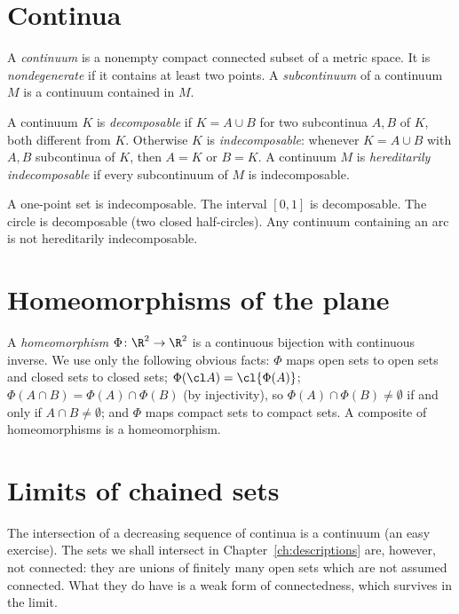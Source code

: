 \section{Continua}

\begin{definition}\label{def:continuum}
A \emph{continuum} is a nonempty compact connected subset of a metric space. It is
\emph{nondegenerate} if it contains at least two points. A \emph{subcontinuum} of a
continuum $M$ is a continuum contained in $M$.
\end{definition}

\begin{definition}\label{def:indecomposable}
A continuum $K$ is \emph{decomposable} if $K=A\cup B$ for two subcontinua $A,B$ of $K$, both
different from $K$. Otherwise $K$ is \emph{indecomposable}: whenever $K=A\cup B$ with $A,B$
subcontinua of $K$, then $A=K$ or $B=K$. A continuum $M$ is \emph{hereditarily
indecomposable} if every subcontinuum of $M$ is indecomposable.
\end{definition}


\begin{example}
A one-point set is indecomposable. The interval $[0,1]$ is decomposable. The circle is
decomposable (two closed half-circles). Any continuum containing an arc is not hereditarily
indecomposable.
\end{example}

\section{Homeomorphisms of the plane}

A \emph{homeomorphism} $\Phi\colon\R^2\to\R^2$ is a continuous bijection with continuous
inverse. We use only the following obvious facts: $\Phi$ maps open sets to open sets and
closed sets to closed sets; $\Phi(\cl A)=\cl{\Phi(A)}$; $\Phi(A\cap B)=\Phi(A)\cap\Phi(B)$ (by
injectivity), so $\Phi(A)\cap\Phi(B)\ne\emptyset$ if and only if $A\cap B\neq\emptyset$; and
$\Phi$ maps compact sets to compact sets. A composite of homeomorphisms is a homeomorphism.

\section{Limits of chained sets}\label{sec:limsup}

The intersection of a decreasing sequence of continua is a continuum (an easy exercise).
The sets we shall intersect in Chapter~\ref{ch:descriptions} are, however, not connected:
they are unions of finitely many open sets which are not assumed connected. What they do
have is a weak form of connectedness, which survives in the limit.

